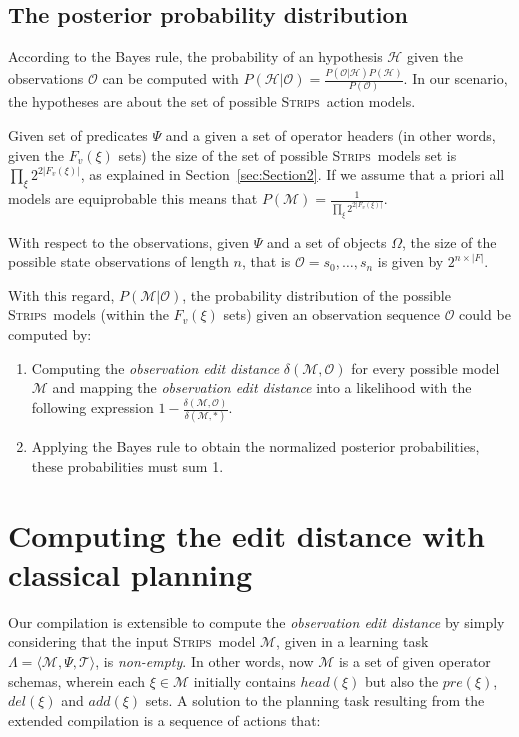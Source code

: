\documentclass[letterpaper]{article} %
\newcommand{\tup}[1]{{\langle #1 \rangle}}
\newcommand{\strips}{\textsc{Strips}}     %
\begin{document}
\subsection{The posterior probability distribution}
According to the Bayes rule, the probability of an hypothesis $\mathcal{H}$ given the observations $\mathcal{O}$ can be computed with $P(\mathcal{H}|\mathcal{O})=\frac{P(\mathcal{O}|\mathcal{H})P(\mathcal{H})}{P(\mathcal{O})}$. In our scenario, the hypotheses are about the set of possible \strips\ action models.

Given set of predicates $\Psi$ and a given a set of operator headers (in other words, given the $F_v(\xi)$ sets) the size of the set of possible \strips\ models set is $\prod_\xi 2^{2|F_v(\xi)|}$, as explained in Section~\ref{sec:Section2}. If we assume that a priori all models are equiprobable this means that $P(\mathcal{M})=\frac{1}{\prod_\xi 2^{2|F_v(\xi)|}}$.


With respect to the observations, given $\Psi$ and a set of objects $\Omega$, the size of the possible state observations of length $n$, that is $\mathcal{O}=s_0,\ldots,s_n$ is given by $2^{n\times|F|}$.

With this regard, $P(\mathcal{M}|\mathcal{O})$, the probability distribution of the possible \strips\ models (within the $F_v(\xi)$ sets) given an observation sequence $\mathcal{O}$ could be computed by:
\begin{enumerate}
\item Computing the {\em observation edit distance} $\delta(\mathcal{M},\mathcal{O})$ for every possible model $\mathcal{M}$ and mapping the {\em observation edit distance} into a likelihood with the following expression $1-\frac{\delta(\mathcal{M},\mathcal{O})}{\delta(\mathcal{M},*)}$. 
\item Applying the Bayes rule to obtain the normalized posterior probabilities, these probabilities must sum 1.
\end{enumerate}


\section{Computing the edit distance with classical planning}
Our compilation is extensible to compute the {\em observation edit distance} by simply considering that the input \strips\ model $\mathcal{M}$, given in a learning task $\Lambda=\tup{\mathcal{M},\Psi,\mathcal{T}}$, is {\em non-empty}. In other words, now $\mathcal{M}$ is a set of given operator schemas, wherein each $\xi\in\mathcal{M}$ initially contains $head(\xi)$ but also the $pre(\xi)$, $del(\xi)$ and $add(\xi)$ sets. A solution to the planning task resulting from the extended compilation is a sequence of actions that:
\end{document}
